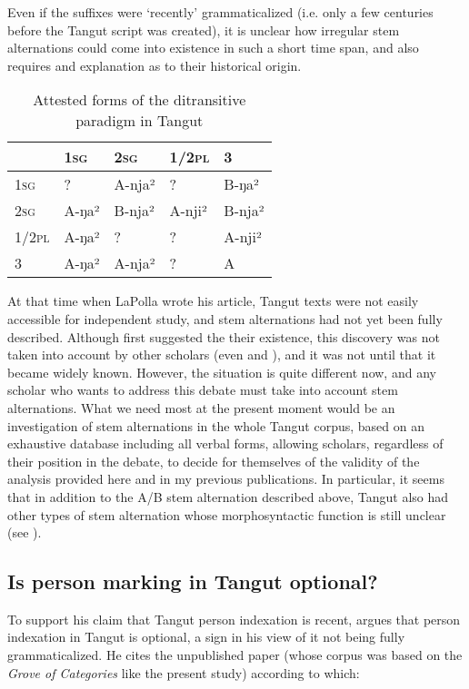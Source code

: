 \documentclass[oldfontcommands,oneside,a4paper,11pt]{article}
\newcommand{\ipa}[1]{{\phon \mbox{#1}}} %
\newcommand{\sg}{\textsc{sg}}
\newcommand{\pl}{\textsc{pl}}
\begin{document}
Even if the suffixes were `recently' grammaticalized (i.e. only a few centuries before the Tangut script was created), it is unclear how irregular stem alternations could come into existence in such a short time span, and also requires and explanation as to their historical origin.


\begin{table}[H]
\caption{Attested forms of the ditransitive paradigm in Tangut}\centering  \label{tab:paradigm}
\begin{tabular}{lllll}
\toprule
	&	1\sg{}	&	2\sg{}	&	1/2\pl{}	&	3	\\
	\midrule
1\sg{}	&	?	&	A-\ipa{nja²}	&	?	&	 B-\ipa{ŋa²}	\\
2\sg{}	&	A-\ipa{ŋa²}	&	B-\ipa{nja²}	&	A-\ipa{nji²}	&	 B-\ipa{nja²}	\\
1/2\pl{}	&	 A-\ipa{ŋa²}	& ?	&	?	&	A-\ipa{nji²}	\\
3	&	A-\ipa{ŋa²}	&	A-\ipa{nja²}	&	?	&	A 	\\
\bottomrule
\end{tabular}
\end{table}



At that time when LaPolla wrote his article, Tangut texts were not easily accessible for independent study, and stem alternations had not yet been fully described. Although \citet{nishida75} first suggested the their existence, this discovery was not taken into account by other scholars (even \citealt{kepping85} and \citealt{driem91tangut}), and it was not until \citet{gong01huying} that it became widely known. However, the situation is quite different now, and any scholar who wants to address this debate must take into account stem alternations. What we need most at the present moment would be an investigation of stem alternations in the whole Tangut corpus, based on an exhaustive database including all verbal forms, allowing scholars, regardless of their position in the debate, to decide for themselves of the validity of the analysis provided here and in my previous publications. In particular, it seems that in addition to the A/B stem alternation described above, Tangut also had other types of stem alternation whose morphosyntactic function is still unclear (see \citealt{jacques14esquisse}).

\subsection{Is person marking in Tangut optional?} \label{sec:optional}
To support his claim that Tangut person indexation is recent, 
\citet{lapolla92} argues that person indexation in Tangut is optional, a sign in his view of it not being fully grammaticalized. He cites the unpublished paper \citet{ahrens90tangut} (whose corpus was based on the \textit{Grove of Categories} like the present study) according to which:
\end{document}
